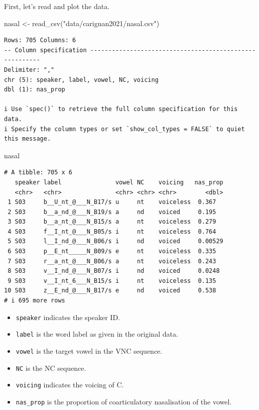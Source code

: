 \documentclass[
  authoryear,
  preprint,
  3p]{elsarticle}
\newenvironment{Shaded}{\begin{snugshade}}{\end{snugshade}}
\newcommand{\FunctionTok}[1]{\textcolor[rgb]{0.28,0.35,0.67}{#1}}
\newcommand{\NormalTok}[1]{\textcolor[rgb]{0.00,0.23,0.31}{#1}}
\newcommand{\OtherTok}[1]{\textcolor[rgb]{0.00,0.23,0.31}{#1}}
\newcommand{\StringTok}[1]{\textcolor[rgb]{0.13,0.47,0.30}{#1}}
\begin{document}
First, let's read and plot the data.

\begin{Shaded}
\begin{Highlighting}[]
\NormalTok{nasal }\OtherTok{\textless{}{-}} \FunctionTok{read\_csv}\NormalTok{(}\StringTok{"data/carignan2021/nasal.csv"}\NormalTok{)}
\end{Highlighting}
\end{Shaded}

\begin{verbatim}
Rows: 705 Columns: 6
-- Column specification --------------------------------------------------------
Delimiter: ","
chr (5): speaker, label, vowel, NC, voicing
dbl (1): nas_prop

i Use `spec()` to retrieve the full column specification for this data.
i Specify the column types or set `show_col_types = FALSE` to quiet this message.
\end{verbatim}

\begin{Shaded}
\begin{Highlighting}[]
\NormalTok{nasal}
\end{Highlighting}
\end{Shaded}

\begin{verbatim}
# A tibble: 705 x 6
   speaker label               vowel NC    voicing   nas_prop
   <chr>   <chr>               <chr> <chr> <chr>        <dbl>
 1 S03     b__U_nt_@___N_B17/s u     nt    voiceless  0.367  
 2 S03     b__a_nd_@___N_B19/s a     nd    voiced     0.195  
 3 S03     b__a_nt_@___N_B15/s a     nt    voiceless  0.279  
 4 S03     f__I_nt_@___N_B05/s i     nt    voiceless  0.764  
 5 S03     l__I_nd_@___N_B06/s i     nd    voiced     0.00529
 6 S03     p__E_nt_____N_B09/s e     nt    voiceless  0.335  
 7 S03     r__a_nt_@___N_B06/s a     nt    voiceless  0.243  
 8 S03     v__I_nd_@___N_B07/s i     nd    voiced     0.0248 
 9 S03     v__I_nt_6___N_B15/s i     nt    voiceless  0.135  
10 S03     z__E_nd_@___N_B17/s e     nd    voiced     0.538  
# i 695 more rows
\end{verbatim}

\begin{itemize}
\item
  \texttt{speaker} indicates the speaker ID.
\item
  \texttt{label} is the word label as given in the original data.
\item
  \texttt{vowel} is the target vowel in the VNC sequence.
\item
  \texttt{NC} is the NC sequence.
\item
  \texttt{voicing} indicates the voicing of C.
\item
  \texttt{nas\_prop} is the proportion of coarticulatory nasalisation of
  the vowel.
\end{itemize}
\end{document}
